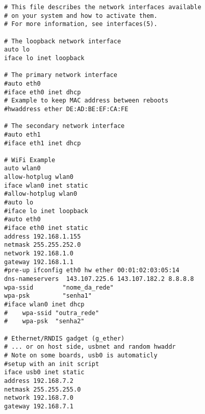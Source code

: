 \lstset{language=bash}
\begin{lstlisting}[frame=single, basicstyle=\linespread{0.85}\ttfamily, caption=/etc/network/interfaces, label=etc_net]
# This file describes the network interfaces available
# on your system and how to activate them.
# For more information, see interfaces(5).

# The loopback network interface
auto lo
iface lo inet loopback

# The primary network interface
#auto eth0
#iface eth0 inet dhcp
# Example to keep MAC address between reboots
#hwaddress ether DE:AD:BE:EF:CA:FE

# The secondary network interface
#auto eth1
#iface eth1 inet dhcp

# WiFi Example
auto wlan0
allow-hotplug wlan0
iface wlan0 inet static
#allow-hotplug wlan0
#auto lo
#iface lo inet loopback
#auto eth0
#iface eth0 inet static
address 192.168.1.155
netmask 255.255.252.0
network 192.168.1.0
gateway 192.168.1.1
#pre-up ifconfig eth0 hw ether 00:01:02:03:05:14
dns-nameservers  143.107.225.6 143.107.182.2 8.8.8.8
wpa-ssid        "nome_da_rede"
wpa-psk         "senha1"
#iface wlan0 inet dhcp
#    wpa-ssid "outra_rede"
#    wpa-psk  "senha2"

# Ethernet/RNDIS gadget (g_ether)
# ... or on host side, usbnet and random hwaddr
# Note on some boards, usb0 is automaticly 
#setup with an init script
iface usb0 inet static
address 192.168.7.2
netmask 255.255.255.0
network 192.168.7.0
gateway 192.168.7.1
\end{lstlisting}
